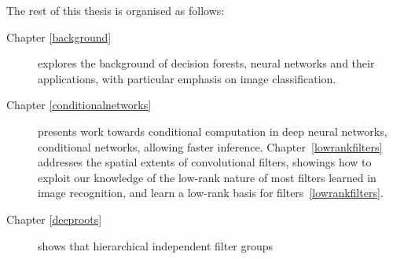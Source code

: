 \documentclass[thesis]{subfiles}
\begin{document}
The rest of this thesis is organised as follows:
\begin{description}
	\item[Chapter \ref{background}] explores the background of decision forests, neural networks and their applications, with particular emphasis on image classification.
	\item[Chapter \ref{conditionalnetworks}] presents work towards conditional computation in deep neural networks, conditional networks, allowing faster inference. Chapter~\ref{lowrankfilters} addresses the spatial extents of convolutional filters, showings how to exploit our knowledge of the low-rank nature of most filters learned in image recognition, and learn a low-rank basis for filters~\ref{lowrankfilters}.
	\item[Chapter \ref{deeproots}] shows that hierarchical independent filter groups  
\end{description}
\end{document}
